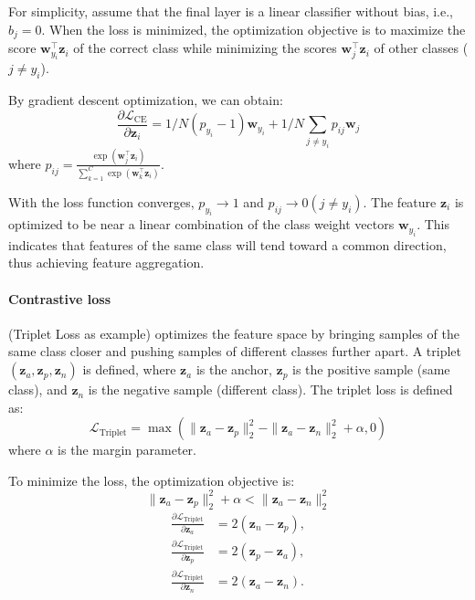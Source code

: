 For simplicity, assume that the final layer is a linear classifier without bias, i.e., $b_j = 0$. When the loss is minimized, the optimization objective is to maximize the score $\mathbf{w}_{y_i}^\top \mathbf{z}_i$ of the correct class while minimizing the scores $\mathbf{w}_j^\top \mathbf{z}_i$ of other classes ($j \neq y_i$).

By gradient descent optimization, we can obtain:
\begin{equation}
\frac{\partial \mathcal{L}_{\text{CE}}}{\partial \mathbf{z}_i} = 1/N\left(p_{y_i} - 1\right) \mathbf{w}_{y_i} + 1/N\sum_{j \neq y_i} p_{ij} \mathbf{w}_j
\end{equation}
where $p_{ij} = \frac{\exp(\mathbf{w}_j^\top \mathbf{z}_i)}{\sum_{k=1}^{C} \exp(\mathbf{w}_k^\top \mathbf{z}_i)}$.

With the loss function converges, $p_{y_i}\rightarrow1$ and $p_{ij}\rightarrow0 (j \neq y_i)$. The feature $\mathbf{z}_i$ is optimized to be near a linear combination of the class weight vectors $\mathbf{w}_{y_i}$. This indicates that features of the same class will tend toward a common direction, thus achieving feature aggregation.

\paragraph{Contrastive loss} (Triplet Loss as example) optimizes the feature space by bringing samples of the same class closer and pushing samples of different classes further apart. A triplet $(\mathbf{z}_a, \mathbf{z}_p, \mathbf{z}_n)$ is defined, where $\mathbf{z}_a$ is the anchor, $\mathbf{z}_p$ is the positive sample (same class), and $\mathbf{z}_n$ is the negative sample (different class). The triplet loss is defined as:
\begin{equation}
\mathcal{L}_{\text{Triplet}} = \max \left( \| \mathbf{z}_a - \mathbf{z}_p \|_2^2 - \| \mathbf{z}_a - \mathbf{z}_n \|_2^2 + \alpha, 0 \right)
\end{equation}
where $\alpha$ is the margin parameter.

To minimize the loss, the optimization objective is:
\begin{equation}
\| \mathbf{z}_a - \mathbf{z}_p \|_2^2 + \alpha < \| \mathbf{z}_a - \mathbf{z}_n \|_2^2
\end{equation}
\begin{align}
\frac{\partial \mathcal{L}_{\text{Triplet}}}{\partial \mathbf{z}_a} &= 2 (\mathbf{z}_n - \mathbf{z}_p), \\
\frac{\partial \mathcal{L}_{\text{Triplet}}}{\partial \mathbf{z}_p} &= 2 (\mathbf{z}_p - \mathbf{z}_a), \\
\frac{\partial \mathcal{L}_{\text{Triplet}}}{\partial \mathbf{z}_n} &= 2 (\mathbf{z}_a - \mathbf{z}_n).
\end{align}

